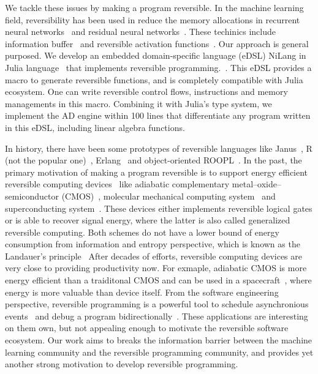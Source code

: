 \documentclass[aps,twocolumn,longbibliography,english,superscriptaddress]{revtex4-1}
\newcommand{\<}{\langle}
\renewcommand{\>}{\rangle}
\theoremstyle{definition}\newtheorem{definition}{\textit{Definition}}
\begin{document}
    We tackle these issues by making a program reversible. In the machine learning field, reversibility has been used in reduce the memory allocations in recurrent neural networks~\cite{MacKay2018} and residual neural networks~\cite{Behrmann2018}. These techinics include information buffer~\cite{Maclaurin2015} and reversible activation functions~\cite{Gomez2017,Jacobsen2018}. Our approach is general purposed. We develop an embedded domain-specific language (eDSL) NiLang in Julia language~\cite{Bezanson2012,Bezanson2017} that implements reversible programming.~\cite{Perumalla2013,Frank2017}.
    This eDSL provides a macro to generate reversible functions, and is completely compatible with Julia ecosystem. One can write reversible control flows, instructions and memory managements in this macro. Combining it with Julia's type system, we implement the AD engine within 100 lines that differentiate any program written in this eDSL, including linear algebra functions.

    In history, there have been some prototypes of reversible languages like Janus~\cite{Lutz1986}, R (not the popular one)~\cite{Frank1997}, Erlang~\cite{Lanese2018} and object-oriented ROOPL~\cite{Haulund2017}. %
    In the past, the primary motivation of making a program reversible is to support energy efficient reversible computing devices~\cite{Frank1999} like adiabatic complementary metal–oxide–semiconductor (CMOS)~\cite{Koller1992}, molecular mechanical computing system~\cite{Merkle2018} and superconducting system~\cite{Likharev1977,Semenov2003}. These devices either implements reversible logical gates or is able to recover signal energy, where the latter is also called generalized reversible computing. Both schemes do not have a lower bound of energy consumption from information and entropy perspective, which is known as the Landauer's principle~\cite{Landauer1961}
    After decades of efforts, reversible computing devices are very close to providing productivity now. For exmaple, adiabatic CMOS is more energy efficient than a traiditonal CMOS and can be used in a spacecraft~\cite{Debenedictis2017}, where energy is more valuable than device itself.
    From the software engineering perspective, reversible programming is a powerful tool to schedule asynchronious events~\cite{Jefferson1985} and debug a program bidirectionally~\cite{Boothe2000}.
    These applications are interesting on them own, but not appealing enough to motivate the reversible software ecosystem.
    Our work aims to breaks the information barrier between the machine learning community and the reversible programming community, and provides yet another strong motivation to develop reversible programming.
\end{document}
